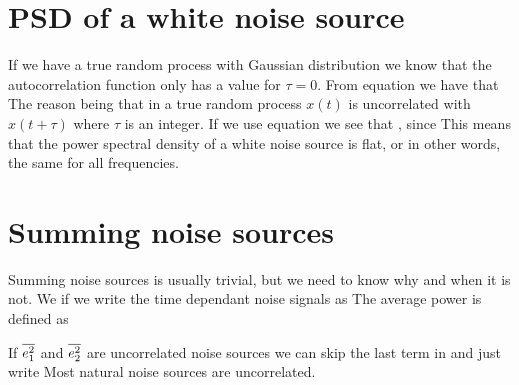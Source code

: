 \documentclass[final,a4paper]{IEEEtran}
\begin{document}
\section{PSD of a white noise source}
If we have a true random process with Gaussian distribution we know that
the autocorrelation function only has a value for $\tau=0$. From
equation  we have that
The reason being that in a true random process $x(t)$ is uncorrelated
with $x(t + \tau )$ where $\tau$ is an integer. If we use equation  we
see that 
, since
 This means that the power spectral
density of a white noise source is flat, or in other words, the same
for all frequencies.

\section{Summing noise sources}

Summing noise sources is usually trivial, but we need to know why and when it is not.
We if we write the  time dependant noise signals as 
The average power is defined as

If $\overline{e_{1}^2}$ and $\overline{e_{2}^2}$ are uncorrelated noise sources we can skip
the last term in  and just write
Most natural noise sources are uncorrelated.
\end{document}
